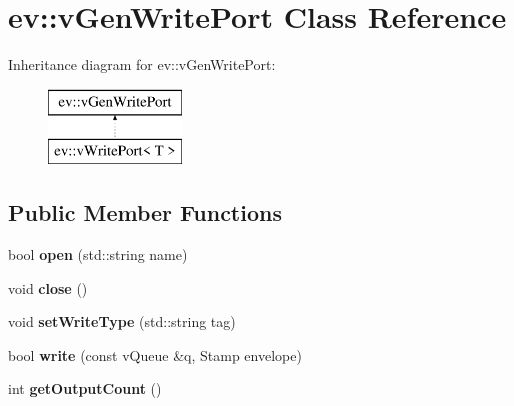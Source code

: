 \hypertarget{classev_1_1vGenWritePort}{}\section{ev\+:\+:v\+Gen\+Write\+Port Class Reference}
\label{classev_1_1vGenWritePort}
Inheritance diagram for ev\+:\+:v\+Gen\+Write\+Port\+:\begin{figure}[H]
\begin{center}
\leavevmode
\includegraphics[height=2.000000cm]{classev_1_1vGenWritePort}
\end{center}
\end{figure}
\subsection*{Public Member Functions}
\begin{DoxyCompactItemize}
\item 
bool {\bfseries open} (std\+::string name)\hypertarget{classev_1_1vGenWritePort_ac28be07060930af3495d0aa88623d943}{}\label{classev_1_1vGenWritePort_ac28be07060930af3495d0aa88623d943}

\item 
void {\bfseries close} ()\hypertarget{classev_1_1vGenWritePort_a0ddb0b5393516226283f0b8d1e870f88}{}\label{classev_1_1vGenWritePort_a0ddb0b5393516226283f0b8d1e870f88}

\item 
void {\bfseries set\+Write\+Type} (std\+::string tag)\hypertarget{classev_1_1vGenWritePort_ae92d013e78ec37a2ea7684dc4c479844}{}\label{classev_1_1vGenWritePort_ae92d013e78ec37a2ea7684dc4c479844}

\item 
bool {\bfseries write} (const v\+Queue \&q, Stamp envelope)\hypertarget{classev_1_1vGenWritePort_a5be1c2f6e5863914757b854652b55761}{}\label{classev_1_1vGenWritePort_a5be1c2f6e5863914757b854652b55761}

\item 
int {\bfseries get\+Output\+Count} ()\hypertarget{classev_1_1vGenWritePort_ad150130d6838dc48311bc7d1006867f5}{}\label{classev_1_1vGenWritePort_ad150130d6838dc48311bc7d1006867f5}

\end{DoxyCompactItemize}

